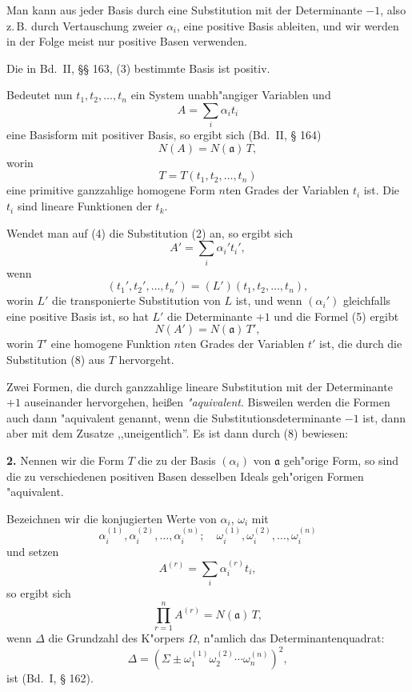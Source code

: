 \documentclass[12pt,a4paper]{article}
\theoremstyle{plain}
\begin{document}
Man kann aus jeder Basis durch eine Substitution mit der Determinante $-1$, also z.\,B. durch Vertauschung zweier $\alpha_i$, eine positive Basis ableiten, und wir werden in der Folge meist nur positive Basen verwenden.

Die in Bd.~II, \S\S{} 163, (3) bestimmte Basis ist positiv.

Bedeutet nun $t_1, t_2, \ldots, t_n$ ein System unabh"angiger Variablen und
\begin{equation}
A = \sum_{i} \alpha_i t_i
\tag{4}
\end{equation}
eine Basisform mit positiver Basis, so ergibt sich (Bd.~II, \S{} 164)
\begin{equation}
N(A) = N(\mathfrak{a})\,T,
\tag{5}
\end{equation}
worin
\begin{equation}
T = T(t_1, t_2, \ldots, t_n)
\tag{6}
\end{equation}
eine primitive ganzzahlige homogene Form $n$ten Grades der Variablen $t_i$ ist. Die $t_i$ sind lineare Funktionen der $t_k$.

Wendet man auf (4) die Substitution (2) an, so ergibt sich
\begin{equation}
A' = \sum_{i} \alpha_i' t_i',
\tag{7}
\end{equation}
wenn
\begin{equation}
(t_1', t_2', \ldots, t_n') = (L')(t_1, t_2, \ldots, t_n),
\tag{8}
\end{equation}
worin $L'$ die transponierte Substitution von $L$ ist, und wenn $(\alpha_i')$ gleichfalls eine positive Basis ist, so hat $L'$ die Determinante $+1$ und die Formel (5) ergibt
\begin{equation}
N(A') = N(\mathfrak{a})\,T',
\tag{9}
\end{equation}
worin $T'$ eine homogene Funktion $n$ten Grades der Variablen $t'$ ist, die durch die Substitution (8) aus $T$ hervorgeht.

Zwei Formen, die durch ganzzahlige lineare Substitution mit der Determinante $+1$ auseinander hervorgehen, hei\ss en \textit{"aquivalent}. Bisweilen werden die Formen auch dann "aquivalent genannt, wenn die Substitutionsdeterminante $-1$ ist, dann aber mit dem Zusatze ,,uneigentlich''. Es ist dann durch (8) bewiesen:

\textbf{2.} Nennen wir die Form $T$ die zu der Basis $(\alpha_i)$ von $\mathfrak{a}$ geh"orige Form, so sind die zu verschiedenen positiven Basen desselben Ideals geh"origen Formen "aquivalent.

Bezeichnen wir die konjugierten Werte von $\alpha_i$, $\omega_i$ mit
\[
\alpha_i^{(1)}, \alpha_i^{(2)}, \ldots, \alpha_i^{(n)};\quad
\omega_i^{(1)}, \omega_i^{(2)}, \ldots, \omega_i^{(n)}
\]
und setzen
\begin{equation}
A^{(r)} = \sum_{i} \alpha_i^{(r)} t_i,
\tag{10}
\end{equation}
so ergibt sich
\begin{equation}
\prod_{r=1}^{n} A^{(r)} = N(\mathfrak{a})\,T,
\tag{11}
\end{equation}
wenn $\Delta$ die Grundzahl des K"orpers $\Omega$, n"amlich das Determinantenquadrat:
\[
\Delta = (\Sigma \pm \omega_1^{(1)} \omega_2^{(2)} \cdots \omega_n^{(n)})^2,
\]
ist (Bd.~I, \S{} 162).
\end{document}
